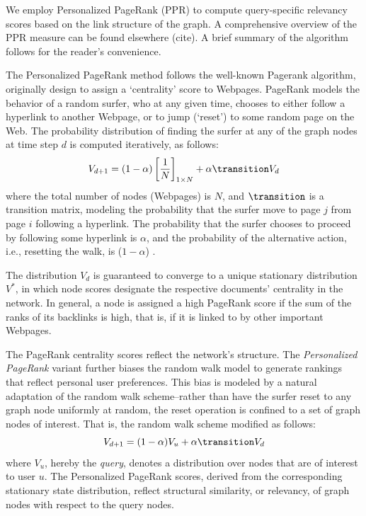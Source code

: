 \documentclass[ijoc,nonblindrev]{informs3} %
\numberwithin{equation}{subsection}
\begin{document}
We employ Personalized PageRank (PPR) \citep{page1999pagerank} to compute query-specific relevancy scores based on the link structure of the graph. A comprehensive overview of the PPR measure can be found elsewhere (cite). A brief summary of the algorithm follows for the reader's convenience.

The Personalized PageRank method follows the well-known Pagerank algorithm, originally design to assign a `centrality' score to Webpages. PageRank models the behavior of a random surfer, who at any given time, chooses to either follow a hyperlink to another Webpage, or to jump (`reset') to some random page on the Web. The probability distribution of finding the surfer at any of the graph nodes at time step $d$ is computed iteratively, as follows:
\begin{equation}
V_{d+1} = (1-\alpha) \left[{1 \over N}\right]_{1 \times N} + \alpha \transition V_d
\label{eq:pagerank}
\end{equation}
where the total number of nodes (Webpages) is $N$, and $\transition$
is a transition matrix, modeling the probability that the surfer move
to page $j$ from page $i$ following a hyperlink. The probability that
the surfer chooses to proceed by following some hyperlink is $\alpha$, and the probability of the alternative action, i.e., resetting the walk, is ($1-\alpha$) .

The distribution $V_d$ is guaranteed to converge to a unique stationary distribution $V^*$, in which node scores designate the respective documents' centrality in the network. In general, a node is assigned a high PageRank score if the sum of the ranks of its backlinks is high, that is, if it is linked to by other important Webpages.

The PageRank centrality scores reflect the network's structure. The {\it Personalized PageRank} variant further biases the random walk model to
generate rankings that reflect personal user preferences. This bias is modeled by a natural adaptation of the random walk scheme--rather than have the surfer reset to any graph node uniformly at random, the reset operation is confined to a set of graph nodes of interest. That is, the random walk scheme modified as follows:
\begin{equation}
V_{d+1} = (1-\alpha) V_u + \alpha \transition V_d
\label{eq:ppr}
\end{equation}
where $V_u$, hereby the {\it query}, denotes a distribution over nodes that are of interest to user $u$. The Personalized PageRank scores, derived from the corresponding stationary state distribution, reflect structural similarity, or relevancy, of graph nodes with respect to the query nodes.
\end{document}
